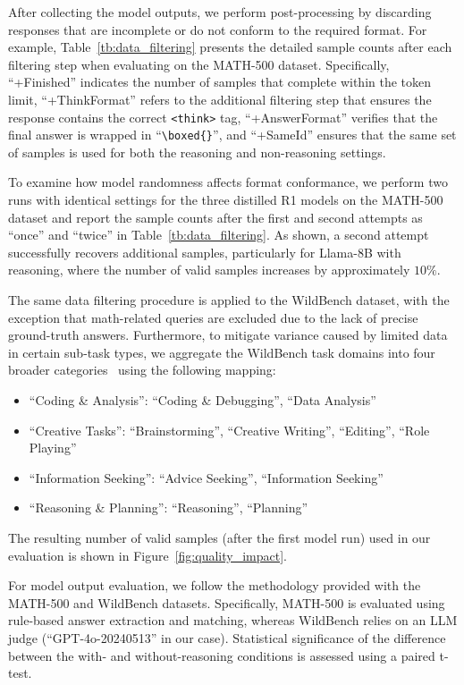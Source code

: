 \documentclass[11pt]{article}
\begin{document}
After collecting the model outputs, we perform post-processing by discarding responses that are incomplete or do not conform to the required format. For example, Table~\ref{tb:data_filtering} presents the detailed sample counts after each filtering step when evaluating on the MATH-500 dataset. Specifically, ``+Finished'' indicates the number of samples that complete within the token limit, ``+ThinkFormat'' refers to the additional filtering step that ensures the response contains the correct \texttt{<think>} tag, ``+AnswerFormat'' verifies that the final answer is wrapped in ``\texttt{\textbackslash boxed\{\}}'', and ``+SameId'' ensures that the same set of samples is used for both the reasoning and non-reasoning settings. 

To examine how model randomness affects format conformance, we perform two runs with identical settings for the three distilled R1 models on the MATH-500 dataset and report the sample counts after the first and second attempts as ``once'' and ``twice'' in Table~\ref{tb:data_filtering}. As shown, a second attempt successfully recovers additional samples, particularly for Llama-8B with reasoning, where the number of valid samples increases by approximately $10\%$. 

The same data filtering procedure is applied to the WildBench dataset, with the exception that math-related queries are excluded due to the lack of precise ground-truth answers. Furthermore, to mitigate variance caused by limited data in certain sub-task types, we aggregate the WildBench task domains into four broader categories~\cite{Lin2024WildBenchBL} using the following mapping:

{\footnotesize
\begin{itemize}[leftmargin=5pt]
    \item ``Coding \& Analysis'': ``Coding \& Debugging'', ``Data Analysis''
    \item ``Creative Tasks'': ``Brainstorming'', ``Creative Writing'', ``Editing'', ``Role Playing''
    \item ``Information Seeking'': ``Advice Seeking'', ``Information Seeking''
    \item ``Reasoning \& Planning'': ``Reasoning'', ``Planning''
\end{itemize}
}
\noindent The resulting number of valid samples (after the first model run) used in our evaluation is shown in Figure~\ref{fig:quality_impact}.

For model output evaluation, we follow the methodology provided with the MATH-500 and WildBench datasets. Specifically, MATH-500 is evaluated using rule-based answer extraction and matching, whereas WildBench relies on an LLM judge (``GPT-4o-20240513'' in our case). Statistical significance of the difference between the with- and without-reasoning conditions is assessed using a paired t-test.
\end{document}
